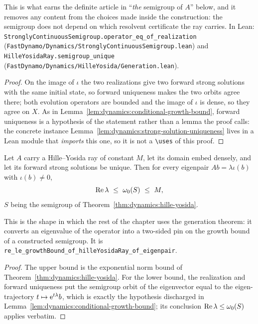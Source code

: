 This is what earns the definite article in ``\emph{the} semigroup of $A $'' below, and it
removes any content from the choices made inside the construction: the semigroup does not
depend on which resolvent certificate the ray carries.  In Lean:
\texttt{StronglyContinuousSemigroup.operator\_eq\_of\_realization}
(\texttt{FastDynamo/Dynamics/StronglyContinuousSemigroup.lean}) and
\texttt{HilleYosidaRay.semigroup\_unique}
(\texttt{FastDynamo/Dynamics/HilleYosida/Generation.lean}).

\begin{proof}
  \leanok
  On the image of $\iota $ the two realizations give two forward strong solutions with the
  same initial state, so forward uniqueness makes the two orbits agree there; both evolution
  operators are bounded and the image of $\iota $ is dense, so they agree on $X $.  As in
  Lemma~\ref{lem:dynamics:conditional-growth-bound}, forward uniqueness is a hypothesis of
  the statement rather than a lemma the proof calls: the concrete instance
  Lemma~\ref{lem:dynamics:strong-solution-uniqueness} lives in a Lean module that
  \emph{imports} this one, so it is not a \texttt{\textbackslash uses} of this proof.
\end{proof}

\begin{lemma}
  \label{lem:dynamics:hille-yosida-growth-sandwich}
  \leanok
  Let $A $ carry a Hille--Yosida ray of constant $M $, let its domain embed densely, and let
  its forward strong solutions be unique.  Then for every eigenpair $Ab=\lambda\iota(b) $
  with $\iota(b)\neq0 $,
  \[
    \operatorname{Re}\lambda\ \leq\ \omega_0(S)\ \leq\ M ,
  \]
  $S $ being the semigroup of Theorem~\ref{thm:dynamics:hille-yosida}.
\end{lemma}

This is the shape in which the rest of the chapter uses the generation theorem: it converts
an eigenvalue of the operator into a two-sided pin on the growth bound of a
constructed semigroup.  It is
\texttt{re\_le\_growthBound\_of\_hilleYosidaRay\_of\_eigenpair}.

\begin{proof}
  \leanok
  The upper bound is the exponential norm bound of Theorem~\ref{thm:dynamics:hille-yosida}.
  For the lower bound, the realization and forward uniqueness put the semigroup orbit of the
  eigenvector equal to the eigen-trajectory $t\mapsto\mathrm{e}^{t\lambda}b $, which is exactly the
  hypothesis discharged in Lemma~\ref{lem:dynamics:conditional-growth-bound}; its conclusion
  $\operatorname{Re}\lambda\leq\omega_0(S) $ applies verbatim.
\end{proof}


